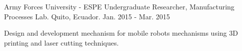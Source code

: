 \begin{cventries}
  \cventry
    {Army Forces University - ESPE}
    {Undergraduate Researcher, Manufacturing Processes Lab.}
    {Quito, Ecuador.}
    {Jan. 2015 - Mar. 2015}
    {
      \begin{cvitems}
        \item {Design and development mechanism for mobile robots mechanisms using 3D printing and laser cutting techniques.}
      \end{cvitems}
    }
        
\end{cventries}
